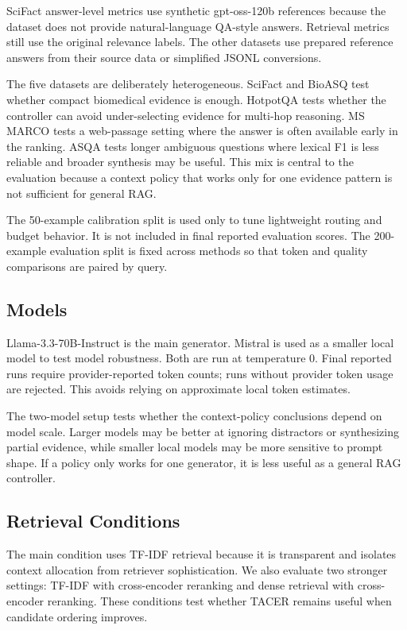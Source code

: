 \documentclass[11pt]{article}
\begin{document}
SciFact answer-level metrics use synthetic gpt-oss-120b references because the dataset does not provide natural-language QA-style answers. Retrieval metrics still use the original relevance labels. The other datasets use prepared reference answers from their source data or simplified JSONL conversions.

The five datasets are deliberately heterogeneous. SciFact and BioASQ test whether compact biomedical evidence is enough. HotpotQA tests whether the controller can avoid under-selecting evidence for multi-hop reasoning. MS MARCO tests a web-passage setting where the answer is often available early in the ranking. ASQA tests longer ambiguous questions where lexical F1 is less reliable and broader synthesis may be useful. This mix is central to the evaluation because a context policy that works only for one evidence pattern is not sufficient for general RAG.

The 50-example calibration split is used only to tune lightweight routing and budget behavior. It is not included in final reported evaluation scores. The 200-example evaluation split is fixed across methods so that token and quality comparisons are paired by query.

\subsection{Models}

Llama-3.3-70B-Instruct is the main generator. Mistral is used as a smaller local model to test model robustness. Both are run at temperature 0. Final reported runs require provider-reported token counts; runs without provider token usage are rejected. This avoids relying on approximate local token estimates.

The two-model setup tests whether the context-policy conclusions depend on model scale. Larger models may be better at ignoring distractors or synthesizing partial evidence, while smaller local models may be more sensitive to prompt shape. If a policy only works for one generator, it is less useful as a general RAG controller.

\subsection{Retrieval Conditions}

The main condition uses TF-IDF retrieval because it is transparent and isolates context allocation from retriever sophistication. We also evaluate two stronger settings: TF-IDF with cross-encoder reranking and dense retrieval with cross-encoder reranking. These conditions test whether TACER remains useful when candidate ordering improves.
\end{document}
